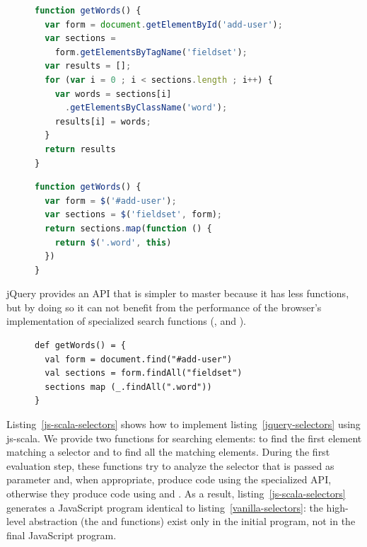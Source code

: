 \documentclass[preprint]{sigplanconf}
\begin{document}
\begin{figure}
\begin{lstlisting}[language=JavaScript,label=vanilla-selectors,caption=Searching elements in plain JavaScript]
function getWords() {
  var form = document.getElementById('add-user');
  var sections =
    form.getElementsByTagName('fieldset');
  var results = [];
  for (var i = 0 ; i < sections.length ; i++) {
    var words = sections[i]
      .getElementsByClassName('word');
    results[i] = words;
  }
  return results
}
\end{lstlisting}
\end{figure}

\begin{figure}
\begin{lstlisting}[language=JavaScript,label=jquery-selectors,caption=Searching elements in jQuery]
function getWords() {
  var form = $('#add-user');
  var sections = $('fieldset', form);
  return sections.map(function () {
    return $('.word', this)
  })
}
\end{lstlisting}
\end{figure}

jQuery provides an API that is simpler to master because it has less functions, but by doing so it can not benefit
from the performance of the browser’s implementation of specialized search functions (,
 and ).

\begin{figure}
\begin{lstlisting}[label=js-scala-selectors,caption=Searching elements in js-scala]
def getWords() = {
  val form = document.find("#add-user")
  val sections = form.findAll("fieldset")
  sections map (_.findAll(".word"))
}
\end{lstlisting}
\end{figure}

Listing~\ref{js-scala-selectors} shows how to implement listing~\ref{jquery-selectors} using js-scala. We
provide two functions for searching elements:  to find the first element matching a selector and
 to find all the matching elements. During the first evaluation step, these functions try to analyze
the selector that is passed as parameter and, when appropriate, produce code using the specialized  API, otherwise
they produce  code using  and . As a result,
listing~\ref{js-scala-selectors} generates a JavaScript program identical to listing~\ref{vanilla-selectors}: the
high-level abstraction (the  and  functions) exist only in the initial program, not in the
final JavaScript program.
\end{document}
